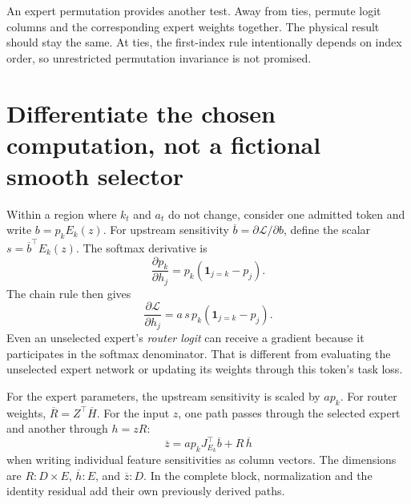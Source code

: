 An expert permutation provides another test. Away from ties, permute logit
columns and the corresponding expert weights together. The physical result
should stay the same. At ties, the first-index rule intentionally depends on
index order, so unrestricted permutation invariance is not promised.

\section{Differentiate the chosen computation, not a fictional smooth selector}
Within a region where $k_t$ and $a_t$ do not change, consider one admitted token
and write $b=p_k E_k(z)$. For upstream sensitivity
$\overline b=\partial\mathcal L/\partial b$, define the scalar
$s=\overline b^\top E_k(z)$. The softmax derivative is
\begin{equation}
\frac{\partial p_k}{\partial h_j}=p_k(\mathbf1_{j=k}-p_j).
\end{equation}
The chain rule then gives
\begin{equation}
\frac{\partial\mathcal L}{\partial h_j}
=a\,s\,p_k(\mathbf1_{j=k}-p_j). \label{eq:routergrad}
\end{equation}
Even an unselected expert's \emph{router logit} can receive a gradient because
it participates in the softmax denominator. That is different from evaluating
the unselected expert network or updating its weights through this token's
task loss.

For the expert parameters, the upstream sensitivity is scaled by $a p_k$.
For router weights, $\overline R=Z^\top\overline H$. For the input $z$, one
path passes through the selected expert and another through $h=zR$:
\begin{equation}
\overline z=a p_k J_{E_k}^{\top}\overline b
+R\,\overline h
\end{equation}
when writing individual feature sensitivities as column vectors. The dimensions
are $R:D\times E$, $\overline h:E$, and $\overline z:D$. In the complete block,
normalization and the identity residual add their own previously derived paths.


